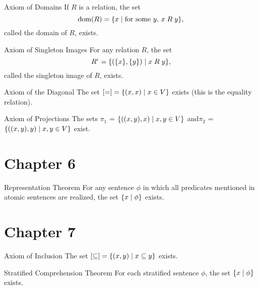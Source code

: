 \begin{axiom}{Axiom of Domains}
 If $R$ is a relation, the set
 $$
  \mathop{\mathrm{dom}}(R) = \{x \mid \mbox{for some $y$, $x \mathrel{R} y$}\},
 $$
 called the {\upshape domain} of $R$, exists.
\end{axiom}

\begin{axiom}{Axiom of Singleton Images%
}
 For any relation $R$, the set
 $$
  R^{\iota} =
  \{(\{x\},\{y\}) \mid x \mathrel{R} y\},
 $$
 called the {\upshape singleton image} of $R$,
 exists.
\end{axiom}

\begin{axiom}{Axiom of the Diagonal}
 The set $[=] = \{(x,x) \mid x \in V\}$ exists (this is
 the equality relation).
\end{axiom}

\begin{axiom}{Axiom of Projections}
 The sets $\pi_1$ = $\{((x,y),x) \mid x,y \in V\}$ and\linebreak $\pi_2$ =
 $\{((x,y),y) \mid x,y \in V\}$ exist.
\end{axiom}



\section *{Chapter 6}

\begin{Thm}{Representation Theorem}
 For any sentence $\phi$ in which all
 predicates mentioned in atomic sentences are realized, the set $\{x
 \mid \phi\}$ exists.
\end{Thm}



\section *{Chapter 7}

\begin{axiom}{Axiom of Inclusion}
 The set $[\subseteq] = \{(x,y) \mid x \subseteq y\}$ exists.
\end{axiom}

\begin{Thm}{Stratified Comprehension Theorem} 
 For each stratified sentence $\phi$, the
 set $\{x \mid \phi\}$ exists.
\end{Thm}




